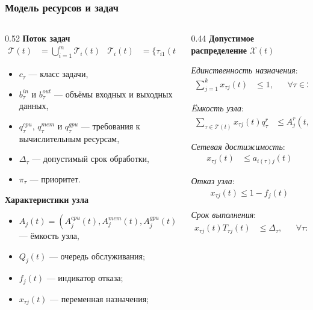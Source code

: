 \begin{frame}
	\frametitle{Модель ресурсов и задач}
	\footnotesize
	\begin{columns}[T,onlytextwidth]
		\begin{column}{0.52\textwidth}
			\textbf{Поток задач}
			\begin{align*}
				\mathcal{T}(t)&=\bigcup_{i=1}^{m}\mathcal{T}_i(t) &
				\mathcal{T}_i(t)&=\{\tau_{i1}(t),\tau_{i2}(t),\ldots\}
			\end{align*}
			\begin{itemize}
				\item $c_{\tau}$ --- класс задачи,
				\item $b^{in}_{\tau}$ и $b^{out}_{\tau}$ --- объёмы входных и выходных данных,
				\item $q^{cpu}_{\tau}$, $q^{mem}_{\tau}$ и $q^{gpu}_{\tau}$ --- требования к вычислительным ресурсам,
				\item $\Delta_{\tau}$ --- допустимый срок обработки,
				\item $\pi_{\tau}$ --- приоритет.
			\end{itemize}
			\textbf{Характеристики узла}
			\begin{itemize}
				\item $A_j(t) = (A^{cpu}_j(t),A^{mem}_j(t),A^{gpu}_j(t)) $ --- ёмкость узла,
				\item $Q_j(t)$ --- очередь обслуживания;
				\item $f_j(t)$ --- индикатор отказа;
				\item $x_{\tau j}(t)$ --- переменная назначения;
			\end{itemize}
		\end{column}
		\begin{column}{0.44\textwidth}
			\textbf{Допустимое распределение}  $\mathcal{X}(t)$

			\textit{Единственность назначения}:
			\begin{align*}
				\sum_{j=1}^{k}x_{\tau j}(t)&\leq 1, && \forall \tau\in\mathcal{T}(t)
			\end{align*}

			\textit{Ëмкость узла}:
			\begin{align*}
				\sum_{\tau\in\mathcal{T}(t)}x_{\tau j}(t)q^{r}_{\tau}&\leq A^{r}_j(t,\kappa_j), && \forall j
			\end{align*}

			\textit{Сетевая достижимость}:
			\begin{align*}
				x_{\tau j}(t)&\leq a_{i(\tau)j}(t)
			\end{align*}

			\textit{Отказ узла}:
			\begin{align*}
				x_{\tau j}(t)\leq 1-f_j(t)
			\end{align*}

			\textit{Срок выполнения}:
			\begin{align*}
				x_{\tau j}(t)T_{\tau j}(t)&\leq \Delta_{\tau}, && \forall \tau:c_{\tau}\in\mathcal{C}^{hard}
			\end{align*}
		\end{column}
	\end{columns}
\end{frame}

